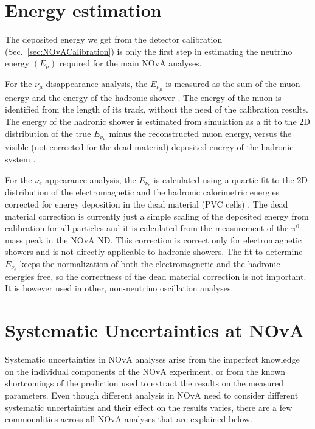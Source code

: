 \section{Energy estimation}\label{sec:NOvAEnergyEstimation}
The deposited energy we get from the detector calibration (Sec.~\ref{sec:NOvACalibration}) is only the first step in estimating the neutrino energy $\left(E_\nu\right)$ required for the main \gls{NOvA} analyses.

For the $\nu_\mu$ disappearance analysis, the $E_{\nu_\mu}$ is measured as the sum of the muon energy and the energy of the hadronic shower \cite{NOvAResults2021.pdf}. The energy of the muon is identified from the length of its track, without the need of the calibration results. The energy of the hadronic shower is estimated from simulation as a fit to the 2D distribution of the true $E_{\nu_\mu}$ minus the reconstructed muon energy, versus the visible (not corrected for the dead material) deposited energy of the hadronic system \cite{PsihasNOvAThesis_ProngCVN.pdf}.

For the $\nu_e$ appearance analysis, the $E_{\nu_e}$ is calculated using a quartic fit to the 2D distribution of the electromagnetic and the hadronic calorimetric energies corrected for energy deposition in the dead material (\gls{PVC} cells) \cite{PsihasNOvAThesis_ProngCVN.pdf}. The dead material correction is currently just a simple scaling of the deposited energy from calibration for all particles and it is calculated from the measurement of the $\pi^0$ mass peak in the \gls{NOvA} \gls{ND}. This correction is correct only for electromagnetic showers and is not directly applicable to hadronic showers. The fit to determine $E_{\nu_e}$ keeps the normalization of both the electromagnetic and the hadronic energies free, so the correctness of the dead material correction is not important. It is however used in other, non-neutrino oscillation analyses.

\section{Systematic Uncertainties at NOvA}\label{sec:NOvASystematics}

Systematic uncertainties in \gls{NOvA} analyses arise from the imperfect knowledge on the individual components of the \gls{NOvA} experiment, or from the known shortcomings of the prediction used to extract the results on the measured parameters. Even though different analysis in \gls{NOvA} need to consider different systematic uncertainties and their effect on the results varies, there are a few commonalities across all \gls{NOvA} analyses that are explained below.

